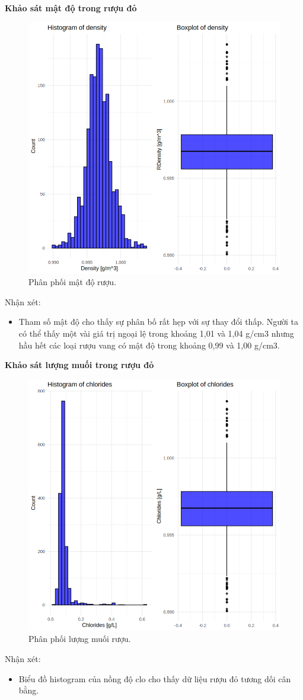 \textbf{Khảo sát mật độ trong rượu đỏ}
\begin{figure}[H]
    \centering
    \includegraphics[width=0.75\columnwidth]{wine_figures/red_density.png}
    \caption{Phân phối mật độ rượu.}
    \label{fig:red_density}
\end{figure}
Nhận xét:
\begin{itemize}
    \item Tham số mật độ cho thấy sự phân bố rất hẹp với sự thay đổi thấp. Người ta có thể thấy một vài giá trị ngoại lệ trong khoảng 1,01 và 1,04 g/cm3 nhưng hầu hết các loại rượu vang có mật độ trong khoảng 0,99 và 1,00 g/cm3.
\end{itemize}

\textbf{Khảo sát lượng muối trong rượu đỏ}
\begin{figure}[H]
    \centering
    \includegraphics[width=0.75\columnwidth]{wine_figures/red_chlorides.png}
    \caption{Phân phối lượng muối rượu.}
    \label{fig:red_chlorides}
\end{figure}
Nhận xét:
\begin{itemize}
    \item Biểu đồ histogram của nồng độ clo cho thấy dữ liệu rượu đỏ tương dối cân bằng.
\end{itemize}

